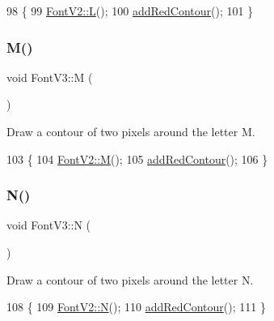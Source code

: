 \begin{DoxyCode}
98                \{
99     \mbox{\hyperlink{class_font_v2_ae40068da683965bc711e752af9acf360}{FontV2::L}}();
100     \mbox{\hyperlink{class_font_v3_a639f1eac0eb6724463813270f47e2696}{addRedContour}}();
101 \}
\end{DoxyCode}
\mbox{\label{class_font_v3_a97d06d45014094a6b0aa35e3cd21255a}} 
\subsubsection{\texorpdfstring{M()}{M()}}
{\footnotesize\ttfamily void Font\+V3\+::M (\begin{DoxyParamCaption}{ }\end{DoxyParamCaption})}



Draw a contour of two pixels around the letter M. 


\begin{DoxyCode}
103                \{
104     \mbox{\hyperlink{class_font_v2_a65ab055c8555447a542ed5c26ef925ee}{FontV2::M}}();
105     \mbox{\hyperlink{class_font_v3_a639f1eac0eb6724463813270f47e2696}{addRedContour}}();
106 \}
\end{DoxyCode}
\mbox{\label{class_font_v3_a0652c4fe89bbd11a617050abb6ed6a96}} 
\subsubsection{\texorpdfstring{N()}{N()}}
{\footnotesize\ttfamily void Font\+V3\+::N (\begin{DoxyParamCaption}{ }\end{DoxyParamCaption})}



Draw a contour of two pixels around the letter N. 


\begin{DoxyCode}
108                \{
109     \mbox{\hyperlink{class_font_v2_ab0f1cbe6375f24c45f6d9bd518165353}{FontV2::N}}();
110     \mbox{\hyperlink{class_font_v3_a639f1eac0eb6724463813270f47e2696}{addRedContour}}();
111 \}
\end{DoxyCode}
\mbox{\label{class_font_v3_a7e65a98126807fe71b04dee05153a858}} 
